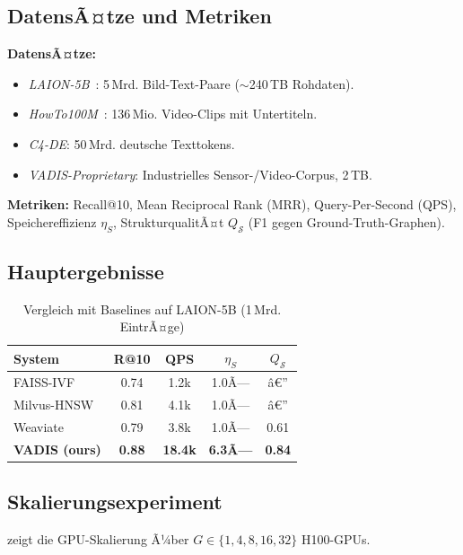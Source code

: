 ﻿\documentclass[12pt,a4paper]{article}
\begin{document}
\subsection{DatensÃ¤tze und Metriken}

\textbf{DatensÃ¤tze:}
\begin{itemize}[leftmargin=1.2em, itemsep=1pt, topsep=2pt]
  \item \textit{LAION-5B}~\cite{schuhmann2022laion}: 
        5\,Mrd. Bild-Text-Paare ($\sim$240\,TB Rohdaten).
  \item \textit{HowTo100M}~\cite{miech2019howto100m}: 
        136\,Mio. Video-Clips mit Untertiteln.
  \item \textit{C4-DE}: 50\,Mrd. deutsche Texttokens.
  \item \textit{VADIS-Proprietary}: 
        Industrielles Sensor-/Video-Corpus, 2\,TB.
\end{itemize}

\textbf{Metriken:} Recall@10, Mean Reciprocal Rank (MRR), 
Query-Per-Second (QPS), Speichereffizienz $\eta_S$, 
StrukturqualitÃ¤t $Q_{\mathcal{S}}$ (F1 gegen Ground-Truth-Graphen).

\subsection{Hauptergebnisse}

\begin{table}[ht]
\centering
\small
\caption{Vergleich mit Baselines auf LAION-5B (1\,Mrd. EintrÃ¤ge)}
\label{tab:results}
\begin{tabular}{@{}lcccc@{}}
\toprule
\textbf{System} & \textbf{R@10} & \textbf{QPS} & 
\textbf{$\eta_S$} & \textbf{$Q_\mathcal{S}$} \\
\midrule
FAISS-IVF & 0.74 & 1.2k & 1.0Ã— & â€” \\
Milvus-HNSW & 0.81 & 4.1k & 1.0Ã— & â€” \\
Weaviate & 0.79 & 3.8k & 1.0Ã— & 0.61 \\
\midrule
\textbf{VADIS (ours)} & \textbf{0.88} & \textbf{18.4k} & \textbf{6.3Ã—} & \textbf{0.84} \\
\bottomrule
\end{tabular}
\end{table}

\subsection{Skalierungsexperiment}

 zeigt die GPU-Skalierung Ã¼ber 
$G \in \{1, 4, 8, 16, 32\}$ H100-GPUs.
\end{document}
